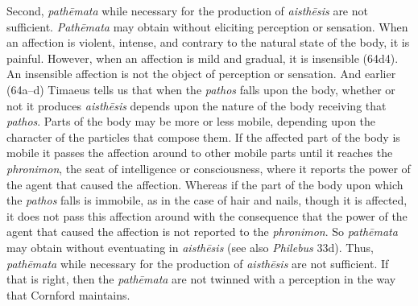 Second, \emph{pathēmata} while necessary for the production of \emph{aisthēsis} are not sufficient. \emph{Pathēmata} may obtain without eliciting perception or sensation. When an affection is violent, intense, and contrary to the natural state of the body, it is painful. However, when an affection is mild and gradual, it is insensible (64d4). An insensible affection is not the object of perception or sensation. And earlier (64a--d) Timaeus tells us that when the \emph{pathos} falls upon the body, whether or not it produces \emph{aisthēsis} depends upon the nature of the body receiving that \emph{pathos}. Parts of the body may be more or less mobile, depending upon the character of the particles that compose them. If the affected part of the body is mobile it passes the affection around to other mobile parts until it reaches the \emph{phronimon}, the seat of intelligence or consciousness, where it reports the power of the agent that caused the affection. Whereas if the part of the body upon which the \emph{pathos} falls is immobile, as in the case of hair and nails, though it is affected, it does not pass this affection around with the consequence that the power of the agent that caused the affection is not reported to the \emph{phronimon}. So \emph{pathēmata} may obtain without eventuating in \emph{aisthēsis} (see also \emph{Philebus} 33d). Thus, \emph{pathēmata} while necessary for the production of \emph{aisthēsis} are not sufficient. If that is right, then the \emph{pathēmata} are not twinned with a perception in the way that Cornford maintains.

